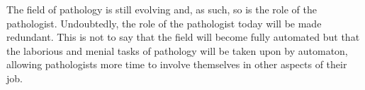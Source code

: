 \documentclass[12pt]{article}
\begin{document}
The field of pathology is still evolving and, as such, so is the role of the pathologist. Undoubtedly, the role of the 
pathologist today will be made redundant. This is not to say that the field will become fully automated but that the 
laborious and menial tasks of pathology will be taken upon by automaton, allowing pathologists more time to involve 
themselves in other aspects of their job.

\printbibliography
\end{document}
